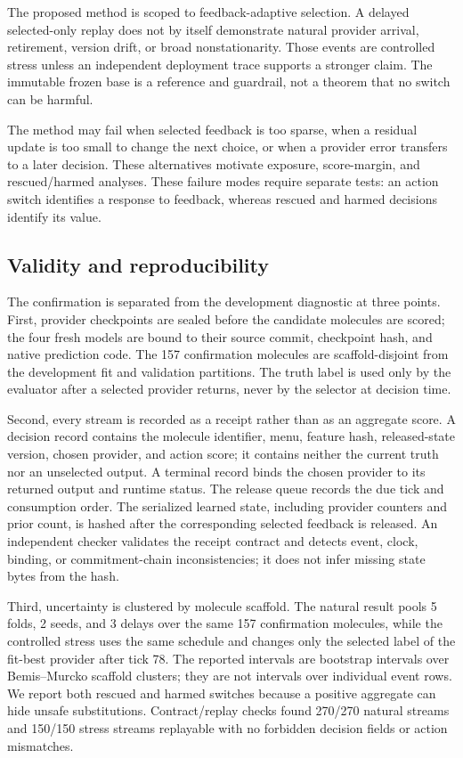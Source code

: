 \documentclass[sigconf,anonymous]{aamas}
\begin{document}
The proposed method is scoped to feedback-adaptive selection. A delayed selected-only replay does not by itself demonstrate natural provider arrival, retirement, version drift, or broad nonstationarity. Those events are controlled stress unless an independent deployment trace supports a stronger claim. The immutable frozen base is a reference and guardrail, not a theorem that no switch can be harmful.

The method may fail when selected feedback is too sparse, when a residual update is too small to change the next choice, or when a provider error transfers to a later decision. These alternatives motivate exposure, score-margin, and rescued/harmed analyses. These failure modes require separate tests: an action switch identifies a response to feedback, whereas rescued and harmed decisions identify its value.

\subsection{Validity and reproducibility}
The confirmation is separated from the development diagnostic at three points. First, provider checkpoints are sealed before the candidate molecules are scored; the four fresh models are bound to their source commit, checkpoint hash, and native prediction code. The 157 confirmation molecules are scaffold-disjoint from the development fit and validation partitions. The truth label is used only by the evaluator after a selected provider returns, never by the selector at decision time.

Second, every stream is recorded as a receipt rather than as an aggregate score. A decision record contains the molecule identifier, menu, feature hash, released-state version, chosen provider, and action score; it contains neither the current truth nor an unselected output. A terminal record binds the chosen provider to its returned output and runtime status. The release queue records the due tick and consumption order. The serialized learned state, including provider counters and prior count, is hashed after the corresponding selected feedback is released. An independent checker validates the receipt contract and detects event, clock, binding, or commitment-chain inconsistencies; it does not infer missing state bytes from the hash.

Third, uncertainty is clustered by molecule scaffold. The natural result pools 5 folds, 2 seeds, and 3 delays over the same 157 confirmation molecules, while the controlled stress uses the same schedule and changes only the selected label of the fit-best provider after tick 78. The reported intervals are bootstrap intervals over Bemis--Murcko scaffold clusters; they are not intervals over individual event rows. We report both rescued and harmed switches because a positive aggregate can hide unsafe substitutions. Contract/replay checks found 270/270 natural streams and 150/150 stress streams replayable with no forbidden decision fields or action mismatches.
\end{document}
